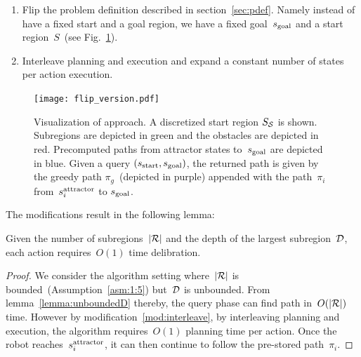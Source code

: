 \documentclass[a4paper]{report}
\begin{document}
\begin{enumerate}[label={\textbf{M\arabic*}},leftmargin=0.75cm]
\item \label{mod:flip} Flip the problem definition described in section~\ref{sec:pdef}. Namely instead of have a fixed start and a goal region, we have a fixed goal~$s_{\text{goal}}$ and a start region~$S$~(see Fig.~\ref{fig:approach_flip}).
\item \label{mod:interleave} Interleave planning and execution and expand a constant number of states per action execution.
\end{enumerate}

\begin{figure}
\centering
\texttt{[image: flip\_version.pdf]}
  \caption{
  Visualization of approach. A discretized start region $S_\mathcal{S}$ is shown. Subregions are depicted in green and the  obstacles are depicted in red.
  Precomputed paths from attractor states to~$s_{\text{goal}}$ are depicted in blue.
 Given a query $(s_{\rm{start}}, s_{\rm{goal}})$, the returned path is given by the greedy path $\pi_g$~(depicted in purple) appended with the path~$\pi_i$ from~$s^{\text{attractor}}_i$ to $s_{\text{goal}}$.
}
    \label{fig:approach_flip}
\end{figure}

The modifications result in the following lemma:
\vspace{2mm}
\begin{lemma}
\label{lemma:var:o1}
	Given the number of subregions~$|\mathcal{R}|$ and the depth of the largest subregion~$\mathcal{D}$, each action requires~$O(1)$ time delibration.
\end{lemma}

\begin{proof}
We consider the algorithm setting where~$|\mathcal{R}|$ is bounded~(Assumption~\ref{asm:1:5}) but~$\mathcal{D}$ is unbounded. From lemma~\ref{lemma:unboundedD} thereby, the query phase can find path in~$O(|\mathcal{R}|)$ time.
%
However by modification~\ref{mod:interleave}, by interleaving planning and execution, the algorithm requires~$O(1)$ planning time per action.
Once the robot reaches~$s^{\text{attractor}}_i$, it can then continue to follow the pre-stored path~$\pi_i$. 
\end{proof}
\end{document}
